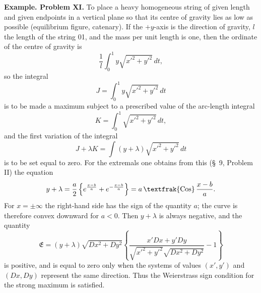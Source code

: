 \documentclass[11pt,a4paper,leqno]{article}
\newcommand{\Cof}{\mathop{\text{\textfrak{Cos}}}\nolimits}
\begin{document}
\noindent\textbf{Example. Problem XI.} To place a heavy homogeneous string of given length and given endpoints in a vertical plane so that its centre of gravity lies as low as possible (equilibrium figure, catenary).
If the $+y$-axis is the direction of gravity, $l$ the length of the string 01, and the mass per unit length is one, then the ordinate of the centre of gravity is
\[
\frac{1}{l}\int_0^1 y\sqrt{x'^2+y'^2}\,dt,
\]
so the integral
\[
J=\int_0^1 y\sqrt{x'^2+y'^2}\,dt
\]
is to be made a maximum subject to a prescribed value of the arc-length integral
\[
K=\int_0^1 \sqrt{x'^2+y'^2}\,dt,
\]
and the first variation of the integral
\[
J+\lambda K=\int (y+\lambda)\sqrt{x'^2+y'^2}\,dt
\]
is to be set equal to zero. For the extremals one obtains from this (\S~9, Problem II) the equation
\[
y+\lambda=\frac{a}{2}\left\{e^{\frac{x-b}{a}}+e^{-\frac{x-b}{a}}\right\}=a\Cof\frac{x-b}{a}.
\]
For $x=\pm\infty$ the right-hand side has the sign of the quantity $a$; the curve is therefore convex downward for $a<0$. Then $y+\lambda$ is always negative, and the quantity
\[
\mathfrak{E}=(y+\lambda)\sqrt{Dx^2+Dy^2}\left\{\frac{x'Dx+y'Dy}{\sqrt{x'^2+y'^2}\sqrt{Dx^2+Dy^2}}-1\right\}
\]
is positive, and is equal to zero only when the systems of values $(x',y')$ and $(Dx,Dy)$ represent the same direction. Thus the Weierstrass sign condition for the strong maximum is satisfied.
\end{document}
